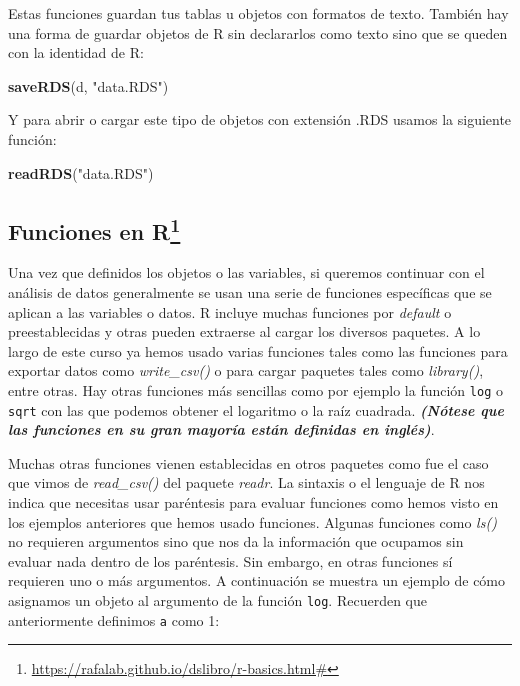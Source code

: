 \documentclass[
]{book}
\newenvironment{Shaded}{\begin{snugshade}}{\end{snugshade}}
\newcommand{\FunctionTok}[1]{\textcolor[rgb]{0.13,0.29,0.53}{\textbf{#1}}}
\newcommand{\NormalTok}[1]{#1}
\newcommand{\StringTok}[1]{\textcolor[rgb]{0.31,0.60,0.02}{#1}}
\begin{document}
Estas funciones guardan tus tablas u objetos con formatos de texto.
También hay una forma de guardar objetos de R sin declararlos como texto sino que se queden con la identidad de R:

\begin{Shaded}
\begin{Highlighting}[]
\FunctionTok{saveRDS}\NormalTok{(d, }\StringTok{"data.RDS"}\NormalTok{)}
\end{Highlighting}
\end{Shaded}

Y para abrir o cargar este tipo de objetos con extensión .RDS usamos la siguiente función:

\begin{Shaded}
\begin{Highlighting}[]
\FunctionTok{readRDS}\NormalTok{(}\StringTok{"data.RDS"}\NormalTok{)}
\end{Highlighting}
\end{Shaded}

\subsection[Funciones en R]{\texorpdfstring{Funciones en R\footnote{\url{https://rafalab.github.io/dslibro/r-basics.html\#}}}{Funciones en R}}\label{funciones-en-r6}

Una vez que definidos los objetos o las variables, si queremos continuar con el análisis de datos generalmente se usan una serie de funciones específicas que se aplican a las variables o datos.
R incluye muchas funciones por \emph{default} o preestablecidas y otras pueden extraerse al cargar los diversos paquetes.
A lo largo de este curso ya hemos usado varias funciones tales como las funciones para exportar datos como \emph{write\_csv()} o para cargar paquetes tales como \emph{library()}, entre otras.
Hay otras funciones más sencillas como por ejemplo la función \texttt{log} o \texttt{sqrt} con las que podemos obtener el logaritmo o la raíz cuadrada.
\textbf{\emph{(Nótese que las funciones en su gran mayoría están definidas en inglés)}}.

Muchas otras funciones vienen establecidas en otros paquetes como fue el caso que vimos de \emph{read\_csv()} del paquete \emph{readr}.
La sintaxis o el lenguaje de R nos indica que necesitas usar paréntesis para evaluar funciones como hemos visto en los ejemplos anteriores que hemos usado funciones.
Algunas funciones como \emph{ls()} no requieren argumentos sino que nos da la información que ocupamos sin evaluar nada dentro de los paréntesis.
Sin embargo, en otras funciones sí requieren uno o más argumentos.
A continuación se muestra un ejemplo de cómo asignamos un objeto al argumento de la función \texttt{log}.
Recuerden que anteriormente definimos \texttt{a} como 1:
\end{document}
